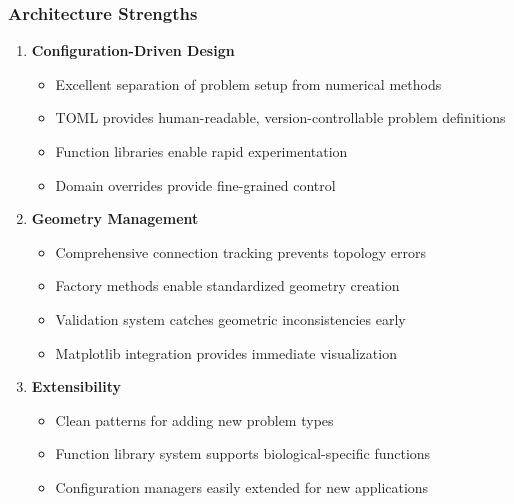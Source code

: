 \subsubsection{Architecture Strengths}
\begin{enumerate}
    \item \textbf{Configuration-Driven Design}
    \begin{itemize}
        \item Excellent separation of problem setup from numerical methods
        \item TOML provides human-readable, version-controllable problem definitions
        \item Function libraries enable rapid experimentation
        \item Domain overrides provide fine-grained control
    \end{itemize}
    
    \item \textbf{Geometry Management}
    \begin{itemize}
        \item Comprehensive connection tracking prevents topology errors
        \item Factory methods enable standardized geometry creation
        \item Validation system catches geometric inconsistencies early
        \item Matplotlib integration provides immediate visualization
    \end{itemize}
    
    \item \textbf{Extensibility}
    \begin{itemize}
        \item Clean patterns for adding new problem types
        \item Function library system supports biological-specific functions
        \item Configuration managers easily extended for new applications
    \end{itemize}
\end{enumerate}

